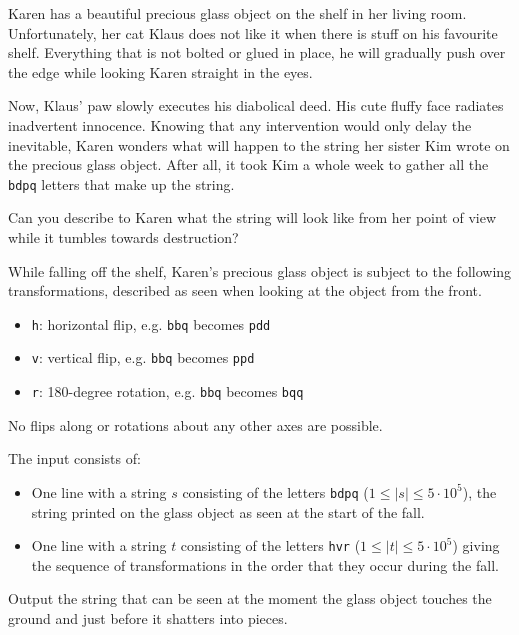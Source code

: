 
%
Karen has a beautiful precious glass object on the shelf in her living room.
Unfortunately, her cat Klaus does not like it when there is stuff on his favourite shelf.
Everything that is not bolted or glued in place, he will gradually push over the edge while looking Karen straight in the eyes.

Now, Klaus' paw slowly executes his diabolical deed. 
His cute fluffy face radiates inadvertent innocence.
Knowing that any intervention would only delay the inevitable, Karen wonders what will happen to the string her sister Kim wrote on the precious glass object.
After all, it took Kim a whole week to gather all the \texttt{bdpq} letters that make up the string.

Can you describe to Karen what the string will look like from her point of view while it tumbles towards destruction?

While falling off the shelf, Karen's precious glass object is subject to the following transformations, described as seen when looking at the object from the front.

\begin{itemize}
  \item \texttt{h}: horizontal flip, e.g. \texttt{bbq} becomes \texttt{pdd}
  \item \texttt{v}: vertical flip, e.g. \texttt{bbq} becomes \texttt{ppd}
  \item \texttt{r}: 180-degree rotation, e.g. \texttt{bbq} becomes \texttt{bqq}
\end{itemize}

No flips along or rotations about any other axes are possible.

\begin{Input}
  The input consists of:
  \begin{itemize}
    \item One line with a string $s$ consisting of the letters \texttt{bdpq} ($1 \le |s| \le 5\cdot 10^5$), the string printed on the glass object as seen at the start of the fall.
    \item One line with a string $t$ consisting of the letters \texttt{hvr}  ($1 \le |t| \le 5\cdot 10^5$) giving the sequence of transformations in the order that they occur during the fall.
  \end{itemize}
\end{Input}

\begin{Output}
  Output the string that can be seen at the moment the glass object touches the ground and just before it shatters into pieces.
\end{Output}
